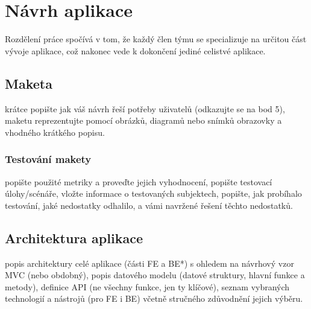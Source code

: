 \documentclass[a4paper, 11pt]{article}
\begin{document}
    \section{Návrh aplikace}
    Rozdělení práce spočívá v tom, že každý člen týmu se specializuje na určitou část vývoje aplikace, což nakonec vede k dokončení jediné celistvé aplikace.

	\subsection{Maketa}
   krátce popište jak váš návrh řeší potřeby uživatelů (odkazujte se na
bod 5), maketu reprezentujte pomocí obrázků, diagramů nebo snímků obrazovky a
vhodného krátkého popisu.

	\subsubsection{Testování makety}

	popište použité metriky a proveďte jejich vyhodnocení, popište
testovací úlohy/scénáře, vložte informace o testovaných subjektech, popište, jak
probíhalo testování, jaké nedostatky odhalilo, a vámi navržené řešení těchto
nedostatků.

	\subsection{Architektura aplikace}

	popis architektury celé aplikace (části FE a BE*) s ohledem na
návrhový vzor MVC (nebo obdobný), popis datového modelu (datové struktury,
hlavní funkce a metody), definice API (ne všechny funkce, jen ty klíčové), seznam
vybraných technologií a nástrojů (pro FE i BE) včetně stručného zdůvodnění jejich
výběru.
\end{document}
